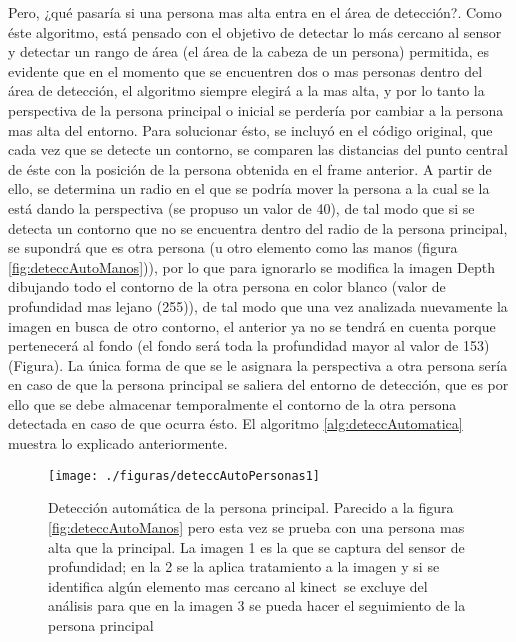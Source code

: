 \documentclass[a4paper,openright,12pt]{report}
\begin{document}
Pero, ¿qué pasaría si una persona mas alta entra en el área de detección?. Como éste algoritmo, está pensado con el objetivo de detectar lo más cercano al sensor y detectar un rango de área (el área de la cabeza de un persona) permitida, es evidente que en el momento que se encuentren dos o mas personas dentro del área de detección, el algoritmo siempre elegirá a la mas alta, y por lo tanto la perspectiva de la persona principal o inicial se perdería por cambiar a la persona mas alta del entorno. Para solucionar ésto, se incluyó en el código original, que cada vez que se detecte un contorno, se comparen las distancias del punto central de éste con la posición de la persona obtenida en el frame anterior. A partir de ello, se determina un radio en el que se podría mover la persona a la cual se la está dando la perspectiva (se propuso un valor de 40), de tal modo que si se detecta un contorno que no se encuentra dentro del radio de la persona principal, se supondrá que es otra persona (u otro elemento como las manos (figura \ref{fig:deteccAutoManos})), por lo que para ignorarlo se modifica la imagen Depth dibujando todo el contorno de la otra persona en color blanco (valor de profundidad mas lejano (255)), de tal modo que una vez analizada nuevamente la imagen en busca de otro contorno, el anterior ya no se tendrá en cuenta porque pertenecerá al fondo (el fondo será toda la profundidad mayor al valor de 153) (Figura). La única forma de que se le asignara la perspectiva a otra persona sería en caso de que la persona principal se saliera del entorno de detección, que es por ello que se debe almacenar temporalmente el contorno de la otra persona detectada en caso de que ocurra ésto. El algoritmo \ref{alg:deteccAutomatica} muestra lo explicado anteriormente.
\begin{figure}[H]
	\centering
	\texttt{[image: ./figuras/deteccAutoPersonas1]}
	\caption[Detección automática de la persona principal]{Detección automática de la persona principal. Parecido a la figura \ref{fig:deteccAutoManos} pero esta vez se prueba con una persona mas alta que la principal. La imagen 1 es la que se captura del sensor de profundidad; en la 2 se la aplica tratamiento a la imagen y si se identifica algún elemento mas cercano al kinect\textcopyright\ se excluye del análisis para que en la imagen 3 se pueda hacer el seguimiento de la persona principal}
	\label{fig:deteccAutoPersonas}
\end{figure}
\end{document}
